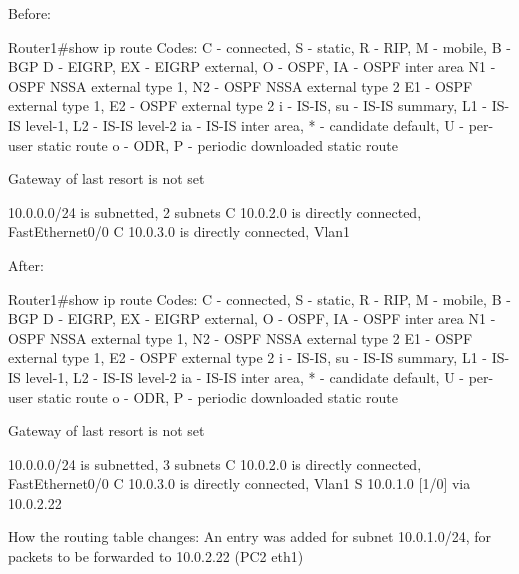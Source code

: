 Before:

Router1#show ip route
Codes: C - connected, S - static, R - RIP, M - mobile, B - BGP
       D - EIGRP, EX - EIGRP external, O - OSPF, IA - OSPF inter area 
       N1 - OSPF NSSA external type 1, N2 - OSPF NSSA external type 2
       E1 - OSPF external type 1, E2 - OSPF external type 2
       i - IS-IS, su - IS-IS summary, L1 - IS-IS level-1, L2 - IS-IS level-2
       ia - IS-IS inter area, * - candidate default, U - per-user static route
       o - ODR, P - periodic downloaded static route

Gateway of last resort is not set

     10.0.0.0/24 is subnetted, 2 subnets
C       10.0.2.0 is directly connected, FastEthernet0/0
C       10.0.3.0 is directly connected, Vlan1


After:

Router1#show ip route
Codes: C - connected, S - static, R - RIP, M - mobile, B - BGP
       D - EIGRP, EX - EIGRP external, O - OSPF, IA - OSPF inter area 
       N1 - OSPF NSSA external type 1, N2 - OSPF NSSA external type 2
       E1 - OSPF external type 1, E2 - OSPF external type 2
       i - IS-IS, su - IS-IS summary, L1 - IS-IS level-1, L2 - IS-IS level-2
       ia - IS-IS inter area, * - candidate default, U - per-user static route
       o - ODR, P - periodic downloaded static route

Gateway of last resort is not set

     10.0.0.0/24 is subnetted, 3 subnets
C       10.0.2.0 is directly connected, FastEthernet0/0
C       10.0.3.0 is directly connected, Vlan1
S       10.0.1.0 [1/0] via 10.0.2.22


How the routing table changes: An entry was added for subnet 10.0.1.0/24, for packets to be forwarded to 10.0.2.22 (PC2 eth1)
